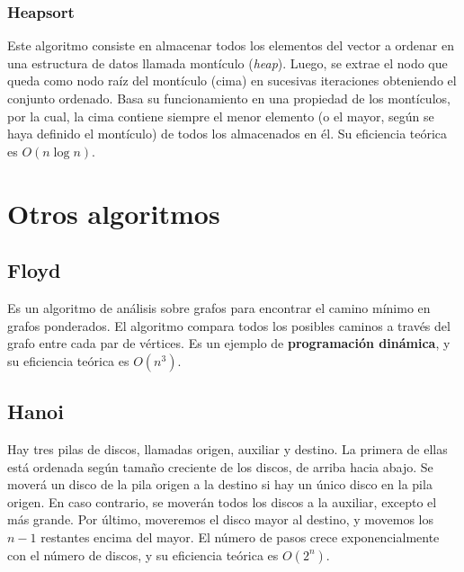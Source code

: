 \documentclass[11pt]{article}
\begin{document}
\begin{center}
	
\end{center}

\subsubsection*{Heapsort}
Este algoritmo consiste en almacenar todos los elementos del vector a ordenar en una estructura de datos llamada montículo (\textit{heap}). Luego, se extrae el nodo que queda como nodo raíz del montículo (cima) en sucesivas iteraciones obteniendo el conjunto ordenado. Basa su funcionamiento en una propiedad de los montículos, por la cual, la cima contiene siempre el menor elemento (o el mayor, según se haya definido el montículo) de todos los almacenados en él. Su eficiencia teórica es $O(n\log n)$.\\
\begin{center}
	
\end{center}
\newpage
\enlargethispage{7\baselineskip}
\section*{Otros algoritmos}
\subsection*{Floyd}
Es un algoritmo de análisis sobre grafos para encontrar el camino mínimo en grafos ponderados. El algoritmo compara todos los posibles caminos a través del grafo entre cada par de vértices. Es un ejemplo de \textbf{programación dinámica}, y su eficiencia teórica es $O(n^3)$.
\begin{center}
	
\end{center}
\subsection*{Hanoi}
Hay tres pilas de discos, llamadas origen, auxiliar y destino. La primera de ellas está ordenada según tamaño creciente de los discos, de arriba hacia abajo. Se moverá un disco de la pila origen a la destino si hay un único disco en la pila origen. En caso contrario, se moverán todos los discos a la auxiliar, excepto el más grande. Por último, moveremos el disco mayor al destino, y movemos los $n-1$ restantes encima del mayor. El número de pasos crece exponencialmente con el número de discos, y su eficiencia teórica es $O(2^n)$.
\begin{center}
	
\end{center}
\newpage
\end{document}
